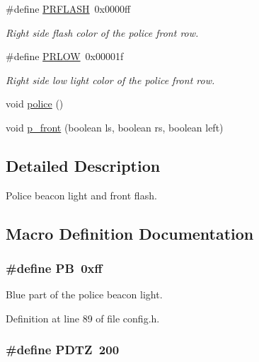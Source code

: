 \begin{DoxyCompactItemize}
\#define \hyperlink{group__police_gac9d0142b6f8cc7735af13e6b91503b97}{P\+R\+F\+L\+A\+SH}~0x0000ff
\begin{DoxyCompactList}\small\item\em Right side flash color of the police front row. \end{DoxyCompactList}\item 
\#define \hyperlink{group__police_gaf4a707e896c2e6df7a0215e4100d75aa}{P\+R\+L\+OW}~0x00001f
\begin{DoxyCompactList}\small\item\em Right side low light color of the police front row. \end{DoxyCompactList}\end{DoxyCompactItemize}
\begin{DoxyCompactItemize}
\item 
void \hyperlink{group__police_ga55d627c45708bc26866e27d49432eee9}{police} ()
\item 
void \hyperlink{group__police_ga82542db5e1a84d584a1725f36caaf71e}{p\+\_\+front} (boolean ls, boolean rs, boolean left)
\end{DoxyCompactItemize}


\subsection{Detailed Description}
Police beacon light and front flash. 



\subsection{Macro Definition Documentation}
\subsubsection[{\texorpdfstring{PB}{PB}}]{\setlength{\rightskip}{0pt plus 5cm}\#define PB~0xff}\hypertarget{group__police_ga2a06f3773d46878dc58f8dadd6fd0d72}{}\label{group__police_ga2a06f3773d46878dc58f8dadd6fd0d72}


Blue part of the police beacon light. 



Definition at line 89 of file config.\+h.

\subsubsection[{\texorpdfstring{P\+D\+TZ}{PDTZ}}]{\setlength{\rightskip}{0pt plus 5cm}\#define P\+D\+TZ~200}\hypertarget{group__police_ga2b9a2b71c1aa4f1c059461e2db7edf44}{}\label{group__police_ga2b9a2b71c1aa4f1c059461e2db7edf44}


